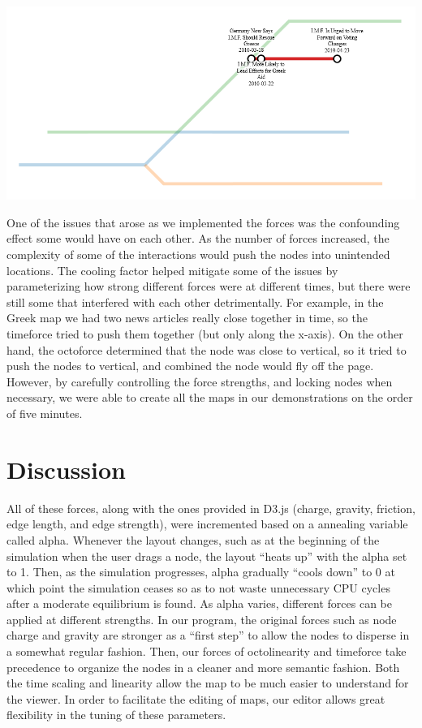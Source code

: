 \documentclass{chi2009}
\begin{document}
\includegraphics[width=\columnwidth]{Metro4.png}

One of the issues that arose as we implemented the forces was the confounding effect some would have on each other.  As the number of forces increased, the complexity of some of the interactions would push the nodes into unintended locations.  The cooling factor helped mitigate some of the issues by parameterizing how strong different forces were at different times, but there were still some that interfered with each other detrimentally.  For example, in the Greek map we had two news articles really close together in time, so the timeforce tried to push them together (but only along the x-axis).  On the other hand, the octoforce determined that the node was close to vertical, so it tried to push the nodes to vertical, and combined the node would fly off the page.  However, by carefully controlling the force strengths, and locking nodes when necessary, we were able to create all the maps in our demonstrations on the order of five minutes.  

\section{Discussion}

All of these forces, along with the ones provided in D3.js (charge, gravity, friction, edge length, and edge strength), were incremented based on a annealing variable called alpha.  Whenever the layout changes, such as at the beginning of the simulation when the user drags a node, the layout “heats up” with the alpha set to 1.  Then, as the simulation progresses, alpha gradually “cools down” to 0 at which point the simulation ceases so as to not waste unnecessary CPU cycles after a moderate equilibrium is found.  As alpha varies, different forces can be applied at different strengths.  In our program, the original forces such as node charge and gravity are stronger as a “first step” to allow the nodes to disperse in a somewhat regular fashion.  Then, our forces of octolinearity and timeforce take precedence to organize the nodes in a cleaner and more semantic fashion.  Both the time scaling and linearity allow the map to be much easier to understand for the viewer.  In order to facilitate the editing of maps, our editor allows great flexibility in the tuning of these parameters.  
\end{document}

